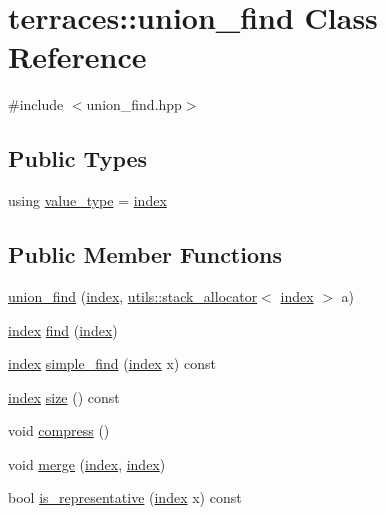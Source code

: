 \hypertarget{classterraces_1_1union__find}{}\section{terraces\+:\+:union\+\_\+find Class Reference}
\label{classterraces_1_1union__find}


{\ttfamily \#include $<$union\+\_\+find.\+hpp$>$}

\subsection*{Public Types}
\begin{DoxyCompactItemize}
\item 
using \hyperlink{classterraces_1_1union__find_a72c65370f63e73215aad5d3ffdde3e55}{value\+\_\+type} = \hyperlink{namespaceterraces_adbc33ccb543d1634e96d0eb02e472c77}{index}
\end{DoxyCompactItemize}
\subsection*{Public Member Functions}
\begin{DoxyCompactItemize}
\item 
\hyperlink{classterraces_1_1union__find_a6a2c8c169e8c19b55c78b8e426d3d7b6}{union\+\_\+find} (\hyperlink{namespaceterraces_adbc33ccb543d1634e96d0eb02e472c77}{index}, \hyperlink{classterraces_1_1utils_1_1stack__allocator}{utils\+::stack\+\_\+allocator}$<$ \hyperlink{namespaceterraces_adbc33ccb543d1634e96d0eb02e472c77}{index} $>$ a)
\item 
\hyperlink{namespaceterraces_adbc33ccb543d1634e96d0eb02e472c77}{index} \hyperlink{classterraces_1_1union__find_a2517df18689c278dc41f14395cd36f5e}{find} (\hyperlink{namespaceterraces_adbc33ccb543d1634e96d0eb02e472c77}{index})
\item 
\hyperlink{namespaceterraces_adbc33ccb543d1634e96d0eb02e472c77}{index} \hyperlink{classterraces_1_1union__find_ab873ad737cf121e74b2aa644006c35ee}{simple\+\_\+find} (\hyperlink{namespaceterraces_adbc33ccb543d1634e96d0eb02e472c77}{index} x) const
\item 
\hyperlink{namespaceterraces_adbc33ccb543d1634e96d0eb02e472c77}{index} \hyperlink{classterraces_1_1union__find_ae76d167c5073215dc310720bfc619d8d}{size} () const
\item 
void \hyperlink{classterraces_1_1union__find_a8c6d1cabc854aedf4b04c6047680b03c}{compress} ()
\item 
void \hyperlink{classterraces_1_1union__find_a27e4ea548412d40c25904739d21e41ca}{merge} (\hyperlink{namespaceterraces_adbc33ccb543d1634e96d0eb02e472c77}{index}, \hyperlink{namespaceterraces_adbc33ccb543d1634e96d0eb02e472c77}{index})
\item 
bool \hyperlink{classterraces_1_1union__find_a6659180419525421c0d4ff6c7e48fc47}{is\+\_\+representative} (\hyperlink{namespaceterraces_adbc33ccb543d1634e96d0eb02e472c77}{index} x) const
\end{DoxyCompactItemize}


